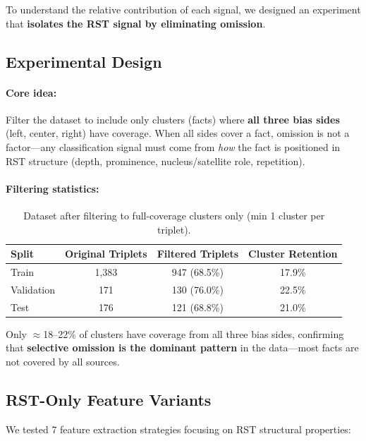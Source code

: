 \documentclass[12pt,a4paper]{article}
\begin{document}
To understand the relative contribution of each signal, we designed an experiment that
\textbf{isolates the RST signal by eliminating omission}.

\subsection{Experimental Design}

\paragraph{Core idea:} Filter the dataset to include only clusters (facts) where \textbf{all three
bias sides} (left, center, right) have coverage. When all sides cover a fact, omission is not
a factor---any classification signal must come from \textit{how} the fact is positioned in
RST structure (depth, prominence, nucleus/satellite role, repetition).

\paragraph{Filtering statistics:}
\begin{table}[h]
\centering
\begin{tabular}{lccc}
\hline
\textbf{Split} & \textbf{Original Triplets} & \textbf{Filtered Triplets} & \textbf{Cluster Retention} \\
\hline
Train & 1,383 & 947 (68.5\%) & 17.9\% \\
Validation & 171 & 130 (76.0\%) & 22.5\% \\
Test & 176 & 121 (68.8\%) & 21.0\% \\
\hline
\end{tabular}
\caption{Dataset after filtering to full-coverage clusters only (min 1 cluster per triplet).}
\label{tab:rst_filtering_stats}
\end{table}

Only $\approx$18--22\% of clusters have coverage from all three bias sides, confirming that
\textbf{selective omission is the dominant pattern} in the data---most facts are not covered
by all sources.

\subsection{RST-Only Feature Variants}

We tested 7 feature extraction strategies focusing on RST structural properties:
\end{document}
